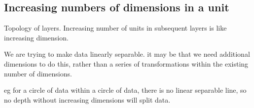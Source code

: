 
\subsection{Increasing numbers of dimensions in a unit}

Topology of layers. Increasing number of units in subsequent layers is like increasing dimension.

We are trying to make data linearly separable. it may be that we need additional dimensions to do this, rather than a series of transformations within the existing number of dimensions.

eg for a circle of data within a circle of data, there is no linear separable line, so no depth without increasing dimensions will split data.

